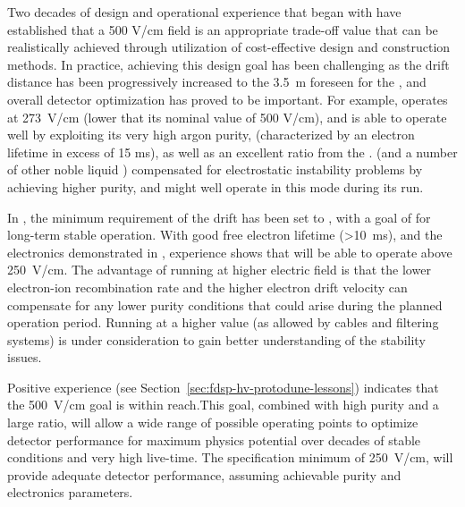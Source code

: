 Two decades of design and operational experience that began with  have established that a 500 V/cm field is an appropriate trade-off value that can be realistically achieved through utilization of cost-effective design and construction methods. In practice, achieving this design goal has been challenging as the drift distance has been progressively increased to the 
\SI{3.5}{m} foreseen for the , and overall detector optimization has proved to be important. For example,  operates  at \SI{273}{V/cm} (lower that its nominal value of 500 V/cm), and is able to operate well by exploiting its very high argon purity, (characterized by an electron lifetime in excess of 15 ms), as well as an excellent  ratio from the  .  %
 (and a number of other noble liquid ) compensated for electrostatic instability problems by achieving higher purity, and  might well operate in this mode during its run. 

In , the minimum requirement of the drift \efield has been set to \mindriftfield, with a goal 
of \mindriftfieldgoal for long-term stable operation. With good free electron lifetime (>\SI{10}{ms}), and the electronics  demonstrated in , experience shows that  will be able to operate above \SI{250}{V/cm}. The advantage of running at higher electric field is that the lower electron-ion recombination rate and the higher electron drift velocity can compensate for any lower purity conditions that could arise during the planned operation period.
 Running  at a higher  value (as allowed by  cables and filtering systems) is under consideration to gain better understanding of the  stability issues.

Positive  experience (see  Section~\ref{sec:fdsp-hv-protodune-lessons}) indicates that the \SI{500}{V/cm} \efield goal is within reach.This goal, combined with high  purity and a large  ratio, will allow  a wide range of possible operating points to optimize detector performance for maximum physics potential over decades of stable conditions and very high live-time. 
The specification minimum of \SI{250}{V/cm}, will provide adequate detector performance, assuming achievable purity and electronics parameters. 

